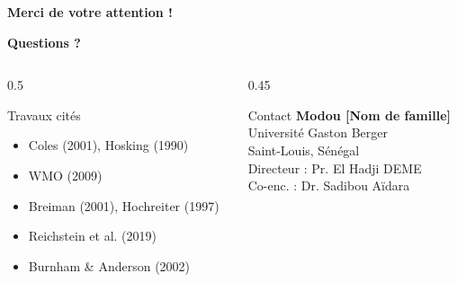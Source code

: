 \documentclass[aspectratio=169, 9pt]{beamer}
\begin{document}
\begin{frame}{}
\begin{center}
  \vspace{0.5cm}
  {\Large\textcolor{ugbblue}{\textbf{Merci de votre attention !}}}

  \vspace{0.8cm}
  {\large\textcolor{ugbgold}{\textbf{Questions ?}}}

  \vspace{1cm}
  \begin{columns}
  \begin{column}{0.5\textwidth}
    \begin{block}{Travaux cités}
    \small
      \begin{itemize}
        \item Coles (2001), Hosking (1990)
        \item WMO (2009)
        \item Breiman (2001), Hochreiter (1997)
        \item Reichstein et al. (2019)
        \item Burnham \& Anderson (2002)
      \end{itemize}
    \end{block}
  \end{column}
  \begin{column}{0.45\textwidth}
    \begin{block}{Contact}
    \small
      \textbf{Modou [Nom de famille]}\\
      Université Gaston Berger\\
      Saint-Louis, Sénégal\\
      \vspace{0.2cm}
      Directeur : Pr. El Hadji DEME\\
      Co-enc. : Dr. Sadibou Aïdara
    \end{block}
  \end{column}
  \end{columns}
\end{center}
\end{frame}

\end{document}
